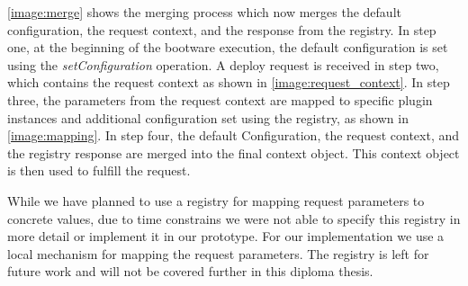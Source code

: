 \autoref{image:merge} shows the merging process which now merges the default configuration, the request context, and the response from the registry.
In step one, at the beginning of the bootware execution, the default configuration is set using the \textit{setConfiguration} operation.
A deploy request is received in step two, which contains the request context as shown in \autoref{image:request_context}.
In step three, the parameters from the request context are mapped to specific plugin instances and additional configuration set using the registry, as shown in \autoref{image:mapping}.
In step four, the default Configuration, the request context, and the registry response are merged into the final context object.
This context object is then used to fulfill the request.

While we have planned to use a registry for mapping request parameters to concrete values, due to time constrains we were not able to specify this registry in more detail or implement it in our prototype.
For our implementation we use a local mechanism for mapping the request parameters.
The registry is left for future work and will not be covered further in this diploma thesis.
